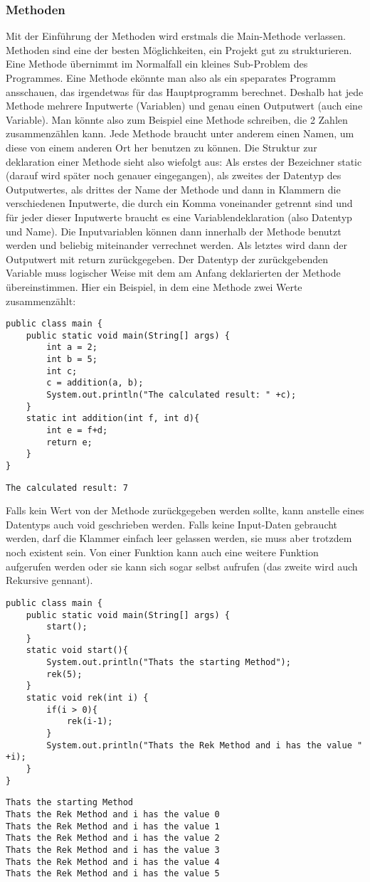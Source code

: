 \subsubsection{Methoden}
Mit der Einführung der Methoden wird erstmals die Main-Methode verlassen. Methoden sind eine der besten Möglichkeiten, ein Projekt gut zu strukturieren. Eine Methode übernimmt im Normalfall ein kleines Sub-Problem des Programmes. Eine Methode ekönnte man also als ein speparates Programm ansschauen, das irgendetwas für das Hauptprogramm berechnet. Deshalb hat jede Methode mehrere Inputwerte (Variablen) und genau einen Outputwert (auch eine Variable). Man könnte also zum Beispiel eine Methode schreiben, die 2 Zahlen zusammenzählen kann. Jede Methode braucht unter anderem einen Namen, um diese von einem anderen Ort her benutzen zu können. Die Struktur zur deklaration einer Methode sieht also wiefolgt aus: Als erstes der Bezeichner static (darauf wird später noch genauer eingegangen), als zweites der Datentyp des Outputwertes, als drittes der Name der Methode und dann in Klammern die verschiedenen Inputwerte, die durch ein Komma voneinander getrennt sind und für jeder dieser Inputwerte braucht es eine Variablendeklaration (also Datentyp und Name). Die Inputvariablen können dann innerhalb der Methode benutzt werden und beliebig miteinander verrechnet werden. Als letztes wird dann der Outputwert mit return zurückgegeben. Der Datentyp der zurückgebenden Variable muss logischer Weise mit dem am Anfang deklarierten der Methode übereinstimmen. Hier ein Beispiel, in dem eine Methode zwei Werte zusammenzählt:
\begin{lstlisting}
public class main {
	public static void main(String[] args) {
		int a = 2;
		int b = 5;
		int c;
		c = addition(a, b);
		System.out.println("The calculated result: " +c);
	}
	static int addition(int f, int d){
		int e = f+d;
		return e;
	}
}
\end{lstlisting}
\begin{lstlisting}[style=console]
The calculated result: 7
\end{lstlisting}
Falls kein Wert von der Methode zurückgegeben werden sollte, kann anstelle eines Datentyps auch void geschrieben werden. Falls keine Input-Daten gebraucht werden, darf die Klammer einfach leer gelassen werden, sie muss aber trotzdem noch existent sein. Von einer Funktion kann auch eine weitere Funktion aufgerufen werden oder sie kann sich sogar selbst aufrufen (das zweite wird auch Rekursive gennant).
\begin{lstlisting}
public class main {
	public static void main(String[] args) {
		start();
	}
	static void start(){
		System.out.println("Thats the starting Method");
		rek(5);
	}
	static void rek(int i) {
		if(i > 0){
			rek(i-1);
		}
		System.out.println("Thats the Rek Method and i has the value " +i);
	}
}
\end{lstlisting}
\begin{lstlisting}[style=console]
Thats the starting Method
Thats the Rek Method and i has the value 0
Thats the Rek Method and i has the value 1
Thats the Rek Method and i has the value 2
Thats the Rek Method and i has the value 3
Thats the Rek Method and i has the value 4
Thats the Rek Method and i has the value 5
\end{lstlisting}
